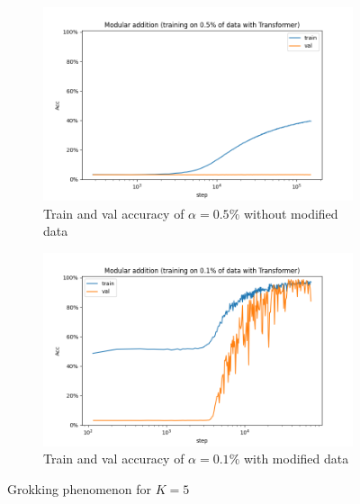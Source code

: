 \begin{figure}[!ht]
	\centering
	\begin{subfigure}{0.45\textwidth}
		\centering
		\includegraphics[width=\linewidth]{fig/Transformer_p=31/K=5/addition_0.5_Transformer_step.png}
		\caption{Train and val accuracy of $\alpha=0.5\%$ without modified data}
		\label{fig:alpha=0.5 without modified data}
	\end{subfigure}
	\begin{subfigure}{0.45\textwidth}
		\centering
		\includegraphics[width=\linewidth]{fig/Transformer_p=31/K=5/addition_0.1_Transformer_step.png}
		\caption{Train and val accuracy of $\alpha=0.1\%$ with modified data}
		\label{fig:alpha=0.1 with modified data}
	\end{subfigure}
	
	\caption{Grokking phenomenon for $K=5$}
	\label{fig:grok_of_K=5}
\end{figure}

